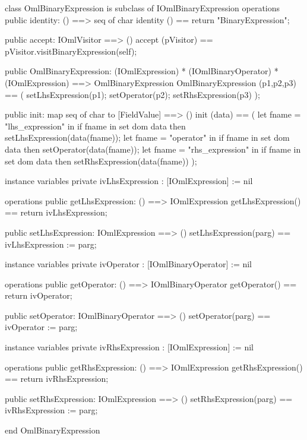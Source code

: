 \begin{vdm_al}
class OmlBinaryExpression is subclass of IOmlBinaryExpression
operations
  public identity: () ==> seq of char
  identity () == return "BinaryExpression";

  public accept: IOmlVisitor ==> ()
  accept (pVisitor) == pVisitor.visitBinaryExpression(self);

  public OmlBinaryExpression:
      (IOmlExpression) *
      (IOmlBinaryOperator) *
      (IOmlExpression) ==> OmlBinaryExpression
  OmlBinaryExpression (p1,p2,p3) == 
   ( setLhsExpression(p1);
     setOperator(p2);
     setRhsExpression(p3) );

  public init: map seq of char to [FieldValue] ==> ()
  init (data) ==
    ( let fname = "lhs_expression" in
        if fname in set dom data
        then setLhsExpression(data(fname));
      let fname = "operator" in
        if fname in set dom data
        then setOperator(data(fname));
      let fname = "rhs_expression" in
        if fname in set dom data
        then setRhsExpression(data(fname)) );

instance variables
  private ivLhsExpression : [IOmlExpression] := nil

operations
  public getLhsExpression: () ==> IOmlExpression
  getLhsExpression() == return ivLhsExpression;

  public setLhsExpression: IOmlExpression ==> ()
  setLhsExpression(parg) == ivLhsExpression := parg;

instance variables
  private ivOperator : [IOmlBinaryOperator] := nil

operations
  public getOperator: () ==> IOmlBinaryOperator
  getOperator() == return ivOperator;

  public setOperator: IOmlBinaryOperator ==> ()
  setOperator(parg) == ivOperator := parg;

instance variables
  private ivRhsExpression : [IOmlExpression] := nil

operations
  public getRhsExpression: () ==> IOmlExpression
  getRhsExpression() == return ivRhsExpression;

  public setRhsExpression: IOmlExpression ==> ()
  setRhsExpression(parg) == ivRhsExpression := parg;

end OmlBinaryExpression
\end{vdm_al}

